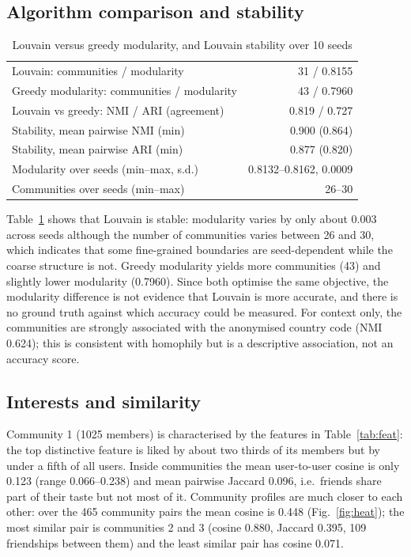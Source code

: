 \documentclass[conference]{IEEEtran}
\begin{document}
\subsection{Algorithm comparison and stability}
\begin{table}[t]
\caption{Louvain versus greedy modularity, and Louvain stability over 10 seeds}
\label{tab:algo}
\centering
\begin{tabular}{lr}
\toprule
Louvain: communities / modularity & 31 / 0.8155 \\
Greedy modularity: communities / modularity & 43 / 0.7960 \\
Louvain vs greedy: NMI / ARI (agreement) & 0.819 / 0.727 \\
Stability, mean pairwise NMI (min) & 0.900 (0.864) \\
Stability, mean pairwise ARI (min) & 0.877 (0.820) \\
Modularity over seeds (min--max, s.d.) & 0.8132--0.8162, 0.0009 \\
Communities over seeds (min--max) & 26--30 \\
\bottomrule
\end{tabular}
\end{table}

Table~\ref{tab:algo} shows that Louvain is stable: modularity varies by only about 0.003 across seeds although the number of communities varies between 26 and 30, which indicates that some fine-grained boundaries are seed-dependent while the coarse structure is not. Greedy modularity yields more communities (43) and slightly lower modularity (0.7960). Since both optimise the same objective, the modularity difference is not evidence that Louvain is more accurate, and there is no ground truth against which accuracy could be measured. For context only, the communities are strongly associated with the anonymised country code (NMI 0.624); this is consistent with homophily \cite{mcpherson2001} but is a descriptive association, not an accuracy score.

\subsection{Interests and similarity}
Community 1 (1025 members) is characterised by the features in Table~\ref{tab:feat}: the top distinctive feature is liked by about two thirds of its members but by under a fifth of all users. Inside communities the mean user-to-user cosine is only 0.123 (range 0.066--0.238) and mean pairwise Jaccard 0.096, i.e.\ friends share part of their taste but not most of it. Community profiles are much closer to each other: over the 465 community pairs the mean cosine is 0.448 (Fig.~\ref{fig:heat}); the most similar pair is communities 2 and 3 (cosine 0.880, Jaccard 0.395, 109 friendships between them) and the least similar pair has cosine 0.071.
\end{document}
